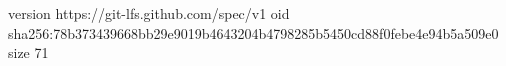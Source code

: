 version https://git-lfs.github.com/spec/v1
oid sha256:78b373439668bb29e9019b4643204b4798285b5450cd88f0febe4e94b5a509e0
size 71
